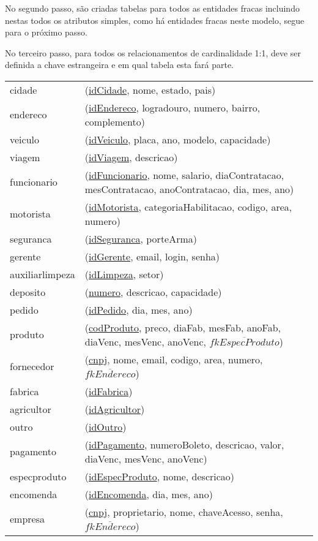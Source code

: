 \documentclass[12pt, onecolumn, titlepage]{article}
\begin{document}
No segundo passo, são criadas tabelas para todos as entidades fracas incluindo nestas todos os atributos simples, como há entidades fracas neste modelo, segue para o próximo passo.

No terceiro passo, para todos os relacionamentos de cardinalidade 1:1, deve ser definida a chave estrangeira e em qual tabela esta fará parte.

\begin{table}[htb!]
\begin{center}
\begin{tabular}{p{2.5cm} p{10.5cm}}
cidade & (\underline{idCidade}, nome, estado, pais) \\
endereco & (\underline{idEndereco}, logradouro, numero, bairro, complemento) \\
veiculo & (\underline{idVeiculo}, placa, ano, modelo, capacidade) \\
viagem & (\underline{idViagem}, descricao) \\
funcionario & (\underline{idFuncionario}, nome, salario, diaContratacao, mesContratacao, anoContratacao, dia, mes, ano)\\
motorista & (\underline{idMotorista}, categoriaHabilitacao, codigo, area, numero)\\
seguranca & (\underline{idSeguranca}, porteArma)\\
gerente & (\underline{idGerente}, email, login, senha)\\
auxiliarlimpeza & (\underline{idLimpeza}, setor)\\
deposito & (\underline{numero}, descricao, capacidade)\\
pedido & (\underline{idPedido}, dia, mes, ano)\\
produto & (\underline{codProduto}, preco, diaFab, mesFab, anoFab, diaVenc, mesVenc, anoVenc, $\overline{fkEspecProduto}$)\\
fornecedor & (\underline{cnpj}, nome, email, codigo, area, numero, $\overline{fkEndereco}$)\\
fabrica & (\underline{idFabrica})\\
agricultor & (\underline{idAgricultor})\\
outro & (\underline{idOutro})\\
pagamento & (\underline{idPagamento}, numeroBoleto, descricao, valor, diaVenc, mesVenc, anoVenc)\\
especproduto & (\underline{idEspecProduto}, nome, descricao)\\
encomenda & (\underline{idEncomenda}, dia, mes, ano)\\
empresa & (\underline{cnpj}, proprietario, nome, chaveAcesso, senha, $\overline{fkEndereco}$)
\end{tabular}
\end{center}
\end{table}
\end{document}
